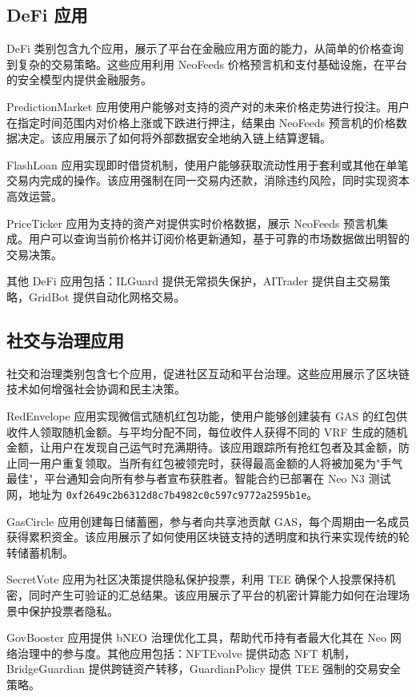 \documentclass[11pt,a4paper]{article}
\begin{document}
\subsection{DeFi 应用}

DeFi 类别包含九个应用，展示了平台在金融应用方面的能力，从简单的价格查询到复杂的交易策略。这些应用利用 NeoFeeds 价格预言机和支付基础设施，在平台的安全模型内提供金融服务。

PredictionMarket 应用使用户能够对支持的资产对的未来价格走势进行投注。用户在指定时间范围内对价格上涨或下跌进行押注，结果由 NeoFeeds 预言机的价格数据决定。该应用展示了如何将外部数据安全地纳入链上结算逻辑。

FlashLoan 应用实现即时借贷机制，使用户能够获取流动性用于套利或其他在单笔交易内完成的操作。该应用强制在同一交易内还款，消除违约风险，同时实现资本高效运营。

PriceTicker 应用为支持的资产对提供实时价格数据，展示 NeoFeeds 预言机集成。用户可以查询当前价格并订阅价格更新通知，基于可靠的市场数据做出明智的交易决策。

其他 DeFi 应用包括：ILGuard 提供无常损失保护，AITrader 提供自主交易策略，GridBot 提供自动化网格交易。

\subsection{社交与治理应用}

社交和治理类别包含七个应用，促进社区互动和平台治理。这些应用展示了区块链技术如何增强社会协调和民主决策。

RedEnvelope 应用实现微信式随机红包功能，使用户能够创建装有 GAS 的红包供收件人领取随机金额。与平均分配不同，每位收件人获得不同的 VRF 生成的随机金额，让用户在发现自己运气时充满期待。该应用跟踪所有抢红包者及其金额，防止同一用户重复领取。当所有红包被领完时，获得最高金额的人将被加冕为"手气最佳"，平台通知会向所有参与者宣布获胜者。智能合约已部署在 Neo N3 测试网，地址为 \texttt{0xf2649c2b6312d8c7b4982c0c597c9772a2595b1e}。

GasCircle 应用创建每日储蓄圈，参与者向共享池贡献 GAS，每个周期由一名成员获得累积资金。该应用展示了如何使用区块链支持的透明度和执行来实现传统的轮转储蓄机制。

SecretVote 应用为社区决策提供隐私保护投票，利用 TEE 确保个人投票保持机密，同时产生可验证的汇总结果。该应用展示了平台的机密计算能力如何在治理场景中保护投票者隐私。

GovBooster 应用提供 bNEO 治理优化工具，帮助代币持有者最大化其在 Neo 网络治理中的参与度。其他应用包括：NFTEvolve 提供动态 NFT 机制，BridgeGuardian 提供跨链资产转移，GuardianPolicy 提供 TEE 强制的交易安全策略。
\end{document}
